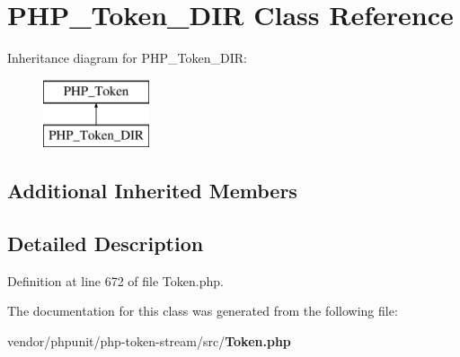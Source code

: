 \section{P\+H\+P\+\_\+\+Token\+\_\+\+D\+I\+R Class Reference}
\label{class_p_h_p___token___d_i_r}
Inheritance diagram for P\+H\+P\+\_\+\+Token\+\_\+\+D\+I\+R\+:\begin{figure}[H]
\begin{center}
\leavevmode
\includegraphics[height=2.000000cm]{class_p_h_p___token___d_i_r}
\end{center}
\end{figure}
\subsection*{Additional Inherited Members}


\subsection{Detailed Description}


Definition at line 672 of file Token.\+php.



The documentation for this class was generated from the following file\+:\begin{DoxyCompactItemize}
\item 
vendor/phpunit/php-\/token-\/stream/src/{\bf Token.\+php}\end{DoxyCompactItemize}
